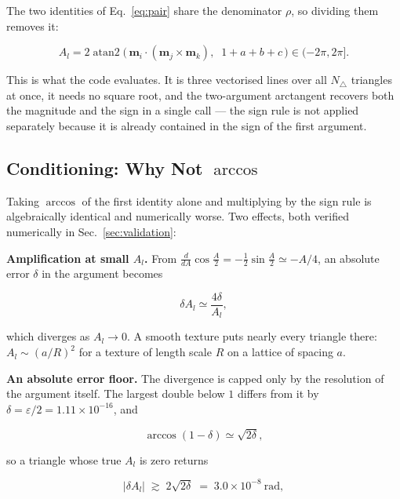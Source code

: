 \documentclass[12pt, a4paper, oneside]{article}
\newcommand{\mvec}{\mathbf{m}}
\newcommand{\Ntri}{N_\triangle}
\newcommand{\eps}{\varepsilon}
\begin{document}
The two identities of Eq.~\eqref{eq:pair} share the denominator $\rho$, so
dividing them removes it:

\begin{equation}
\boxed{
    A_l = 2\operatorname{atan2}
    \bigl(\,\mvec_i\cdot(\mvec_j\times\mvec_k),\;\;
             1 + a + b + c\,\bigr) \in (-2\pi, 2\pi] .
}
\label{eq:atan2}
\end{equation}

This is what the code evaluates. It is three vectorised lines over all
$\Ntri$ triangles at once, it needs no square root, and the two-argument
arctangent recovers both the magnitude and the sign in a single call --- the
sign rule is not applied separately because it is already contained in the sign
of the first argument.

\subsection{Conditioning: Why Not \texorpdfstring{$\arccos$}{arccos}}
\label{sec:conditioning}

Taking $\arccos$ of the first identity alone and multiplying by the sign rule is
algebraically identical and numerically worse. Two effects, both verified
numerically in Sec.~\ref{sec:validation}:

\textbf{Amplification at small $A_l$.} From
$\frac{d}{dA}\cos\frac{A}{2} = -\frac{1}{2}\sin\frac{A}{2} \simeq -A/4$, an
absolute error $\delta$ in the argument becomes

\begin{equation}
    \delta A_l \simeq \frac{4\delta}{A_l} ,
\end{equation}

which diverges as $A_l\to0$. A smooth texture puts nearly every triangle there:
$A_l \sim (a/R)^2$ for a texture of length scale $R$ on a lattice of spacing
$a$.

\textbf{An absolute error floor.} The divergence is capped only by the
resolution of the argument itself. The largest double below $1$ differs from it
by $\delta = \eps/2 = 1.11\times10^{-16}$, and

\begin{equation}
    \arccos(1-\delta) \simeq \sqrt{2\delta} ,
\end{equation}

so a triangle whose true $A_l$ is zero returns

\begin{equation}
\boxed{
    |\delta A_l| \;\gtrsim\; 2\sqrt{2\delta} \;=\; 3.0\times10^{-8}\ \text{rad},
}
\label{eq:floor}
\end{equation}
\end{document}
